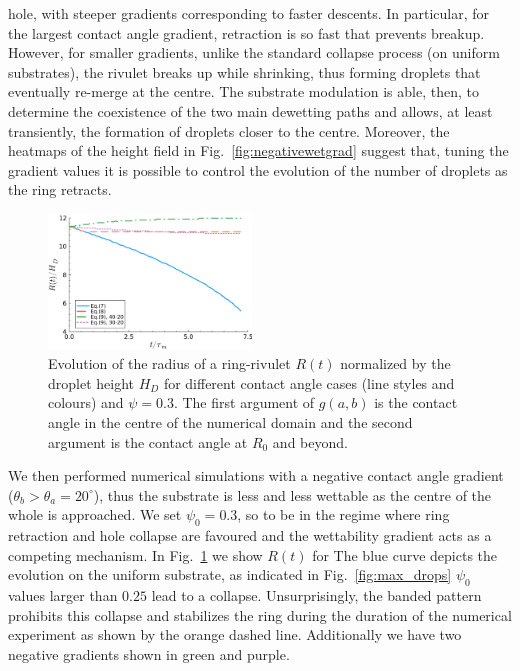\documentclass[twoside,twocolumn,9pt]{article}
\begin{document}
hole, with steeper gradients corresponding to faster descents.
In particular, for the largest contact angle gradient, retraction is so fast that prevents breakup. 
However, for smaller gradients, unlike the standard collapse process 
(on uniform substrates), the rivulet breaks up while shrinking, thus forming droplets that 
eventually re-merge at the centre. The substrate modulation is able, then, to determine the coexistence of the two main dewetting paths and allows, at least transiently, the formation of droplets closer to the centre. Moreover, the heatmaps of the height field in Fig.~\ref{fig:negativewetgrad} suggest that, tuning the gradient values it is possible to control the evolution of the number of droplets as the ring retracts.\\
\begin{figure}
    \centering
    \includegraphics[width=0.48\textwidth]{assets/radius_time_gradient_positive.pdf}
    \caption{Evolution of the radius of a ring-rivulet $R(t)$ normalized by the droplet height $H_D$ for different contact angle cases (line styles and colours) and $\psi = 0.3$.
    The first argument of $g(a,b)$ is the contact angle in the centre of the numerical domain and the second argument is the contact angle at $R_0$ and beyond.}
    \label{fig:positivewetgrad}
\end{figure}
We then performed numerical simulations with a negative contact angle gradient ($\theta_b > \theta_a = 20^{\circ}$), thus the substrate is less and less wettable as the centre of the whole is approached.
We set $\psi_0 = 0.3$, so to be in the regime where ring retraction and hole collapse are favoured and the wettability gradient acts as a competing mechanism.
In Fig.~\ref{fig:positivewetgrad} we show $R(t)$ for 
The blue curve depicts the evolution on the uniform substrate, as indicated in Fig.~\ref{fig:max_drops} $\psi_0$ values larger than $0.25$ lead to a collapse.
Unsurprisingly, the banded pattern prohibits this collapse and stabilizes the ring during the duration of the numerical experiment as shown by the orange dashed line.
Additionally we have two negative gradients shown in green and purple. 
\end{document}
